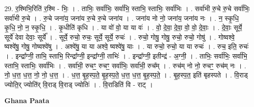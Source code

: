 \documentclass[17pt]{extarticle}
\begin{document}
29. र॒श्मिभि॒रिति॑ र॒श्मि - भिः॒ । . ताभिः॒ सर्वा॑भिः॒ सर्वा॑भि॒ स्ताभि॒ स्ताभिः॒ सर्वा॑भिः । . सर्वा॑भी रु॒चे रु॒चे सर्वा॑भिः॒ सर्वा॑भी रु॒चे । . रु॒चे जना॑य॒ जना॑य रु॒चे रु॒चे जना॑य । . जना॑य नो नो॒ जना॑य॒ जना॑य नः । . न॒ स्कृ॒धि॒ कृ॒धि॒ नो॒ न॒ स्कृ॒धि॒ । . कृ॒धीति॑ कृधि । . या वो॑ वो॒ या या वः॑ । . वो॒ दे॒वा॒ दे॒वा॒ वो॒ वो॒ दे॒वाः॒ । . दे॒वाः॒ सूर्ये॒ सूर्ये॑ देवा देवाः॒ सूर्ये᳚ । . सूर्ये॒ रुचो॒ रुचः॒ सूर्ये॒ सूर्ये॒ रुचः॑ । . रुचो॒ गोषु॒ गोषु॒ रुचो॒ रुचो॒ गोषु॑ । . गोष्वश्वे॒ ष्वश्वे॑षु॒ गोषु॒ गोष्वश्वे॑षु । . अश्वे॑षु॒ या या अश्वे॒ ष्वश्वे॑षु॒ याः । . या रुचो॒ रुचो॒ या या रुचः॑ । . रुच॒ इति॒ रुचः॑ । . इन्द्रा᳚ग्नी॒ ताभि॒ स्ताभि॒ रिन्द्रा᳚ग्नी॒ इन्द्रा᳚ग्नी॒ ताभिः॑ । . इन्द्रा᳚ग्नी॒ इतीन्द्र॑ - अ॒ग्नी॒ । . ताभिः॒ सर्वा॑भिः॒ सर्वा॑भि॒ स्ताभि॒ स्ताभिः॒ सर्वा॑भिः । . सर्वा॑भी॒ रुचꣳ॒॒ रुचꣳ॒॒ सर्वा॑भिः॒ सर्वा॑भी॒ रुच᳚म् । . रुच॑म् नो नो॒ रुचꣳ॒॒ रुच॑म् नः । . नो॒ ध॒त्त॒ ध॒त्त॒ नो॒ नो॒ ध॒त्त॒ । . ध॒त्त॒ बृ॒ह॒स्प॒ते॒ बृ॒ह॒स्प॒ते॒ ध॒त्त॒ ध॒त्त॒ बृ॒ह॒स्प॒ते॒ । . बृ॒ह॒स्प॒त॒ इति॑ बृहस्पते । . वि॒राड् ज्योति॒र् ज्योति॑र् वि॒राड् वि॒राड् ज्योतिः॑ । . वि॒राडिति॑ वि - राट् । \newline

\textbf{Ghana Paata } \newline
\end{document}
